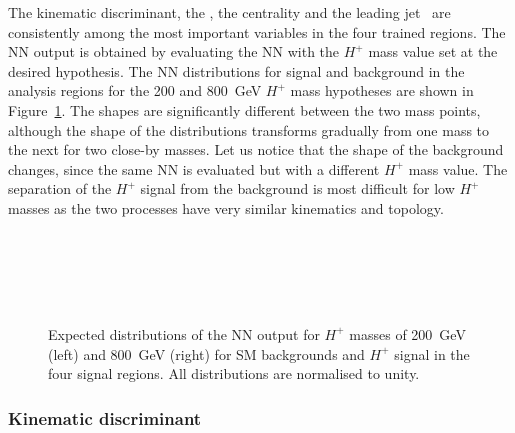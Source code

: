 The kinematic discriminant, the \HTjets, the centrality and the leading jet \pT\ are consistently among the most important variables in the four trained regions. The NN output is obtained by evaluating the NN with the $H^+$ mass value set at the desired hypothesis. The NN distributions for signal and background in the analysis regions for the 200 and 800~GeV $H^+$ mass hypotheses are shown in Figure~\ref{Hplustb:NNshapes}. The shapes are significantly different between the two mass points, although the shape of the distributions transforms gradually from one mass to the next for two close-by masses. Let us notice that the shape of the background changes, since the same NN is evaluated but with a different $H^+$ mass value. The separation of the $H^+$ signal from the background is most difficult for low $H^+$ masses as the two processes have very similar kinematics and topology.

\begin{figure}[htb]
    \RawFloats
    \centering
    \\
     \\
     \\
     \\

    \caption{Expected distributions of the NN output for $H^+$ masses of 200~GeV (left)
    and 800~GeV (right) for SM backgrounds and $H^+$ signal in the four signal regions.
    All distributions are normalised to unity.
    }
    \label{Hplustb:NNshapes}
\end{figure}
\clearpage
\subsubsection{Kinematic discriminant}
\label{Hplustb:SectionHplusDiscriminant}

